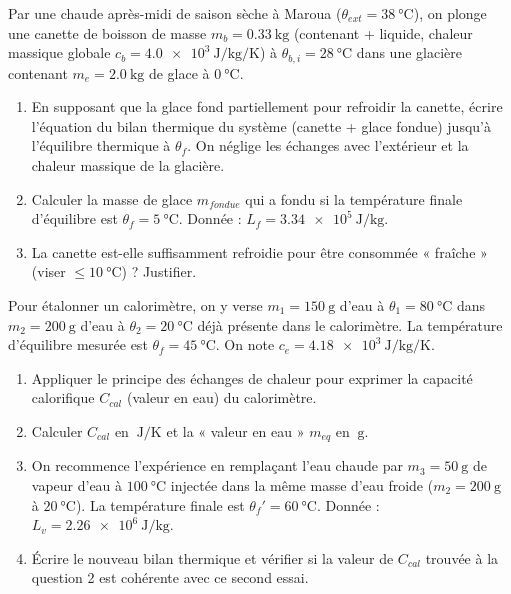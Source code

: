 \documentclass[11pt]{article}
\begin{document}
\begin{exercice}
Par une chaude après-midi de saison sèche à Maroua ($\theta_{ext} = \SI{38}{\celsius}$), on plonge une canette de boisson de masse $m_b = \SI{0,33}{\kilogram}$ (contenant + liquide, chaleur massique globale $c_b = \SI{4,0e3}{\joule\per\kilogram\per\kelvin}$) à $\theta_{b,i} = \SI{28}{\celsius}$ dans une glacière contenant $m_e = \SI{2,0}{\kilogram}$ de glace à $\SI{0}{\celsius}$.
\begin{enumerate}
    \item En supposant que la glace fond partiellement pour refroidir la canette, écrire l'équation du bilan thermique du système (canette + glace fondue) jusqu'à l'équilibre thermique à $\theta_f$. On néglige les échanges avec l'extérieur et la chaleur massique de la glacière.
    \item Calculer la masse de glace $m_{fondue}$ qui a fondu si la température finale d'équilibre est $\theta_f = \SI{5}{\celsius}$. Donnée : $L_f = \SI{3,34e5}{\joule\per\kilogram}$.
    \item La canette est-elle suffisamment refroidie pour être consommée « fraîche » (viser $\le \SI{10}{\celsius}$) ? Justifier.
\end{enumerate}
\end{exercice}

\begin{exercice}
Pour étalonner un calorimètre, on y verse $m_1 = \SI{150}{\gram}$ d'eau à $\theta_1 = \SI{80}{\celsius}$ dans $m_2 = \SI{200}{\gram}$ d'eau à $\theta_2 = \SI{20}{\celsius}$ déjà présente dans le calorimètre. La température d'équilibre mesurée est $\theta_f = \SI{45}{\celsius}$. On note $c_e = \SI{4,18e3}{\joule\per\kilogram\per\kelvin}$.
\begin{enumerate}
    \item Appliquer le principe des échanges de chaleur pour exprimer la capacité calorifique $C_{cal}$ (valeur en eau) du calorimètre.
    \item Calculer $C_{cal}$ en $\SI{}{\joule\per\kelvin}$ et la « valeur en eau » $m_{eq}$ en $\SI{}{\gram}$.
    \item On recommence l'expérience en remplaçant l'eau chaude par $m_3 = \SI{50}{\gram}$ de vapeur d'eau à $\SI{100}{\celsius}$ injectée dans la même masse d'eau froide ($m_2 = \SI{200}{\gram}$ à $\SI{20}{\celsius}$). La température finale est $\theta_f' = \SI{60}{\celsius}$. Donnée : $L_v = \SI{2,26e6}{\joule\per\kilogram}$.
    \item Écrire le nouveau bilan thermique et vérifier si la valeur de $C_{cal}$ trouvée à la question 2 est cohérente avec ce second essai.
\end{enumerate}
\end{exercice}
\end{document}
